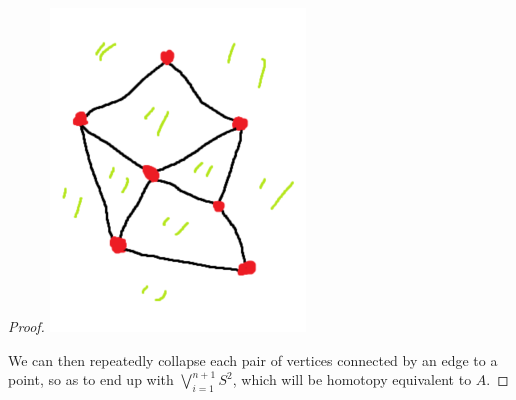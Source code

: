 \documentclass{article}
\begin{document}
\begin{proof}
\includegraphics[scale=0.5]{Screenshot (1352).png} 

We can then repeatedly collapse each pair of vertices connected by an edge to a point, so as to end up with $\bigvee_{i=1}^{n+1}S^2$, which will be homotopy equivalent to $A$.
\end{proof}
\end{document}
